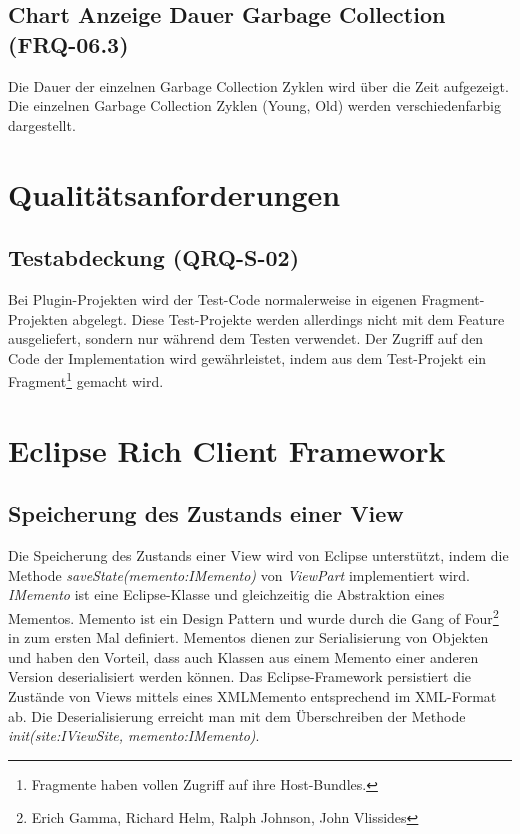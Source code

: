 \subsection{Chart Anzeige Dauer Garbage Collection (FRQ-06.3)}
Die Dauer der einzelnen Garbage Collection Zyklen wird über die Zeit aufgezeigt. Die einzelnen Garbage Collection Zyklen (Young, Old) werden verschiedenfarbig dargestellt.


\section{Qualitätsanforderungen}
\subsection{Testabdeckung (QRQ-S-02)}\label{testing}
Bei Plugin-Projekten wird der Test-Code normalerweise in eigenen Fragment-Projekten abgelegt. Diese Test-Projekte werden allerdings nicht mit dem Feature ausgeliefert, sondern nur während dem Testen verwendet. Der Zugriff auf den Code der Implementation wird gewährleistet, indem aus dem Test-Projekt ein Fragment\footnote{Fragmente haben vollen Zugriff auf ihre Host-Bundles.} gemacht wird.

\section{Eclipse Rich Client Framework}
\subsection{Speicherung des Zustands einer View}\label{memento}
Die Speicherung des Zustands einer View wird von Eclipse unterstützt, indem die Methode \textit{saveState(memento:IMemento)} von \textit{ViewPart} implementiert wird. \textit{IMemento} ist eine Eclipse-Klasse und gleichzeitig die Abstraktion eines Mementos. Memento ist ein Design Pattern und wurde durch die Gang of Four\footnote{Erich Gamma, Richard Helm, Ralph Johnson, John Vlissides} in \cite[S. 283]{gamma1995design} zum ersten Mal definiert. Mementos dienen zur Serialisierung von Objekten und haben den Vorteil, dass auch Klassen aus einem Memento einer anderen Version deserialisiert werden können. Das Eclipse-Framework persistiert die Zustände von Views mittels eines XMLMemento entsprechend im XML-Format ab. Die Deserialisierung erreicht man mit dem Überschreiben der Methode \textit{init(site:IViewSite, memento:IMemento)}.


